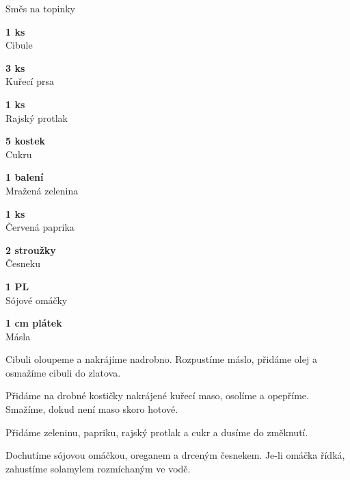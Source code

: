 \documentclass[11pt,a4paper]{article}
\begin{document}
\begin{recipe}[BrickRed]{Směs na topinky}
    \begin{ingredients}
        \item \parbox[t]{\linewidth}{\raggedright \piece \textbf{1 ks}\\ Cibule}
        \item \parbox[t]{\linewidth}{\raggedright \weight \textbf{3 ks}\\ Kuřecí prsa}
        \item \parbox[t]{\linewidth}{\raggedright \liquid \textbf{1 ks}\\ Rajský protlak}
        \item \parbox[t]{\linewidth}{\raggedright \piece \textbf{5 kostek}\\ Cukru}
        \item \parbox[t]{\linewidth}{\raggedright \indefinite \textbf{1 balení}\\ Mražená zelenina}
        \item \parbox[t]{\linewidth}{\raggedright \piece \textbf{1 ks}\\ Červená paprika}
        \item \parbox[t]{\linewidth}{\raggedright \piece \textbf{2 stroužky}\\ Česneku}
        \item \parbox[t]{\linewidth}{\raggedright \spoon \textbf{1 PL}\\ Sójové omáčky}
        \item \parbox[t]{\linewidth}{\raggedright \piece \textbf{1 cm plátek}\\ Másla}
    \end{ingredients}
    \begin{steps}
        \item Cibuli oloupeme a nakrájíme nadrobno. Rozpustíme máslo, přidáme olej a osmažíme cibuli do zlatova. 
        \item Přidáme na drobné kostičky nakrájené kuřecí maso, osolíme a opepříme. Smažíme, dokud není maso skoro hotové. 
        \item Přidáme zeleninu, papriku, rajský protlak a cukr a dusíme do změknutí. 
        \item Dochutíme sójovou omáčkou, oreganem a drceným česnekem. Je-li omáčka řídká, zahustíme solamylem rozmíchaným ve vodě.
    \end{steps}
\end{recipe}

\end{document}
